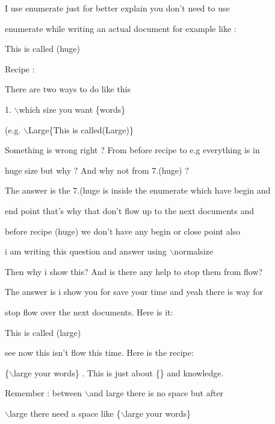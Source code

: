 \documentclass[11pt]{article}
\begin{document}
  
  \vspace{1cm}  
  
  I use enumerate just for better explain you don't need to use
  
  enumerate while writing an actual document for example like :
  
  \huge{This is called (huge)}

Recipe :

There are two ways to do like this

1. $\backslash$which size you want \{words\}

(e.g. $\backslash$Large\{This is called(Large)\}

\vspace{1cm}

\normalsize Something is wrong right ? From before recipe to e.g everything is in 

huge size but why ? And why not from 7.(huge) ?

The answer is the 7.(huge is inside the enumerate which have begin and

end point that's why that don't flow up to the next documents and

before recipe (huge) we don't have any begin or close point also

i am writing this question and answer using $\backslash$normalsize

\vspace{1cm}

Then why i show this? And is there any help to stop them from flow?

The answer is i show you for save your time and yeah there is way for

stop flow over the next documents. Here is it:

\vspace{1cm}

{\large This is called (large)}

\vspace{1cm}

see now this isn't flow this time. Here is the recipe:

\{$\backslash$large your words\}  . This is just about \{\} and knowledge.

Remember : between $\backslash$and large there is no space but after 

$\backslash$large there need a space like \{$\backslash$large your words\}

\vspace{1cm}
\end{document}
